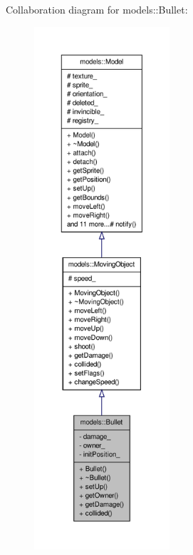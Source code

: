 \-Collaboration diagram for models\-:\-:\-Bullet\-:
\nopagebreak
\begin{figure}[H]
\begin{center}
\leavevmode
\includegraphics[height=550pt]{d2/dd1/classmodels_1_1Bullet__coll__graph}
\end{center}
\end{figure}
